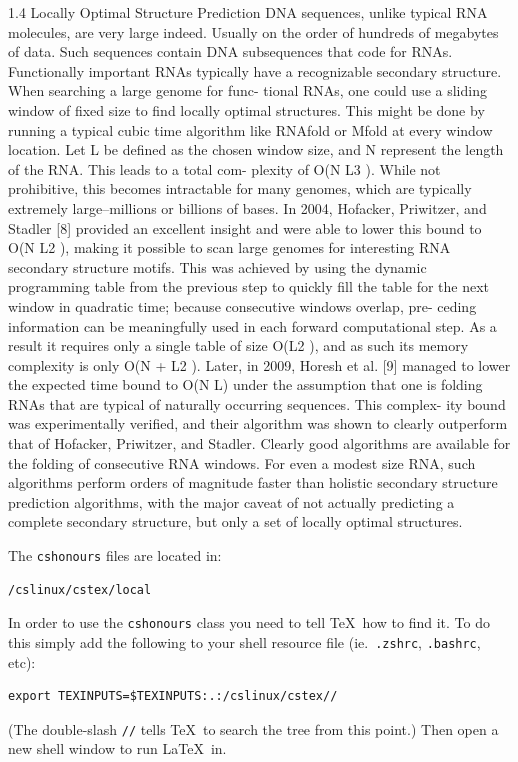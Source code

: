 \documentclass{cshonours}
\begin{document}
1.4 Locally Optimal Structure Prediction
DNA sequences, unlike typical RNA molecules, are very large indeed. Usually
on the order of hundreds of megabytes of data. Such sequences contain DNA
subsequences that code for RNAs. Functionally important RNAs typically have
a recognizable secondary structure. When searching a large genome for func-
tional RNAs, one could use a sliding window of fixed size to find locally optimal
structures. This might be done by running a typical cubic time algorithm like
RNAfold or Mfold at every window location. Let L be defined as the chosen
window size, and N represent the length of the RNA. This leads to a total com-
plexity of O(N L3 ). While not prohibitive, this becomes intractable for many
genomes, which are typically extremely large–millions or billions of bases. In
2004, Hofacker, Priwitzer, and Stadler [8] provided an excellent insight and were
able to lower this bound to O(N L2 ), making it possible to scan large genomes
for interesting RNA secondary structure motifs. This was achieved by using the
dynamic programming table from the previous step to quickly fill the table for
the next window in quadratic time; because consecutive windows overlap, pre-
ceding information can be meaningfully used in each forward computational step.
As a result it requires only a single table of size O(L2 ), and as such its memory complexity is only O(N + L2 ). Later, in 2009, Horesh et al. [9] managed
to lower the expected time bound to O(N L) under the assumption that one is
folding RNAs that are typical of naturally occurring sequences. This complex-
ity bound was experimentally verified, and their algorithm was shown to clearly
outperform that of Hofacker, Priwitzer, and Stadler. Clearly good algorithms are
available for the folding of consecutive RNA windows. For even a modest size
RNA, such algorithms perform orders of magnitude faster than holistic secondary
structure prediction algorithms, with the major caveat of not actually predicting
a complete secondary structure, but only a set of locally optimal structures.





The {\tt cshonours} files are located in:
\begin{verbatim}
/cslinux/cstex/local
\end{verbatim}

In order to use the {\tt cshonours} class you need to tell \TeX\ how
to find it. To do this simply add the following to your shell resource
file (ie.\ {\tt .zshrc}, {\tt .bashrc}, etc):
\begin{verbatim}
export TEXINPUTS=$TEXINPUTS:.:/cslinux/cstex//
\end{verbatim}
(The double-slash \verb!//! tells \TeX\ to search the tree from this
point.) Then open a new shell window to run \LaTeX\ in.
\end{document}
